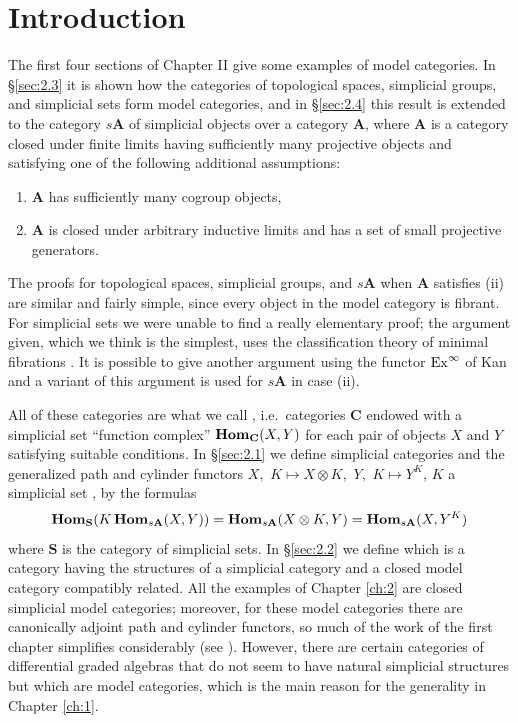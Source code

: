 \documentclass[../main]{subfiles}
\begin{document}
\section{Introduction}\label{sec:2.0}
The first four sections of Chapter II give some examples of model categories. In \S\ref{sec:2.3} it is shown how the categories of topological spaces, simplicial groups, and simplicial sets form model categories, and in \S\ref{sec:2.4} this result is extended to the category $s\mathbf A$ of simplicial objects over a category $\mathbf A$, where $\mathbf A$ is a category closed under finite limits having sufficiently many projective objects and satisfying one of the following additional assumptions: 
\begin{enumerate}[label = (\roman*)]
    \item $\mathbf A$ has sufficiently many cogroup objects,
    \item $\mathbf A$ is closed under arbitrary inductive limits and has a set of small projective generators. 
\end{enumerate}
The proofs for topological spaces, simplicial groups, and $s \mathbf A$ when $\mathbf A$ satisfies (ii) are similar and fairly simple, since every object in the model category is fibrant. For simplicial sets we were unable to find a really elementary proof; the argument given, which we think is the simplest, uses the classification theory of minimal fibrations \cite{barratt_semisimplicial_1959}. It is possible to give another argument using the functor $\operatorname{Ex}^\infty$ of Kan \cite{kan_css_1957-1} and a variant of this argument is used for $s\mathbf A$ in case (ii).

All of these categories are what we call , i.e.\ categories $\mathbf C$ endowed with a simplicial set ``function complex'' $\operatorname{\mathbf{Hom}}_{\mathbf C}(X, Y)$ for each pair of objects $X$ and $Y$ satisfying suitable conditions. In \S\ref{sec:2.1} we define simplicial categories and the generalized path and cylinder functors $X,\,\,K \mapsto X \otimes K$, $\,Y,\,\,K \mapsto Y^K$, $K$ a simplicial set , by the formulas 
\[
\operatorname{\mathbf{Hom}}_{\mathbf S}(K \operatorname{\mathbf{Hom}}_{s\mathbf A}(X,Y))=\operatorname{\mathbf{Hom}}_{s\mathbf{A}}(X \otimes K, Y) = \operatorname{\mathbf{Hom}}_{s\mathbf A} (X, Y^K)
\]
where $\mathbf S$ is the category of simplicial sets. In \S\ref{sec:2.2} we define  which is a category having the structures of a simplicial category and a closed model category compatibly related. All the examples of Chapter \ref{ch:2} are closed simplicial model categories; moreover, for these model categories there are canonically adjoint path and cylinder functors, so much of the work of the first chapter simplifies considerably (see \cite{kan_css_1957}). However, there are certain categories of differential graded algebras that do not seem to have natural simplicial structures but which are model categories, which is the main reason for the generality in Chapter \ref{ch:1}.
\end{document}
